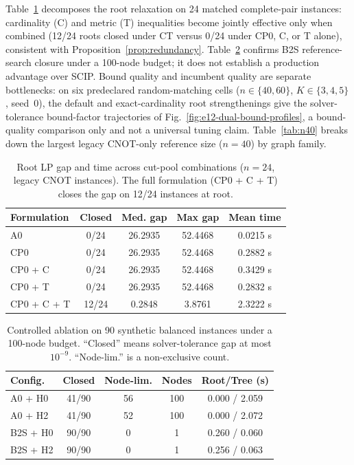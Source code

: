 \documentclass[
  aps,
  pra,
  reprint,
  amsmath,
  amssymb,
  longbibliography,
  nofootinbib,
  floatfix
]{revtex4-2}
\theoremstyle{plain}
\newcommand{\tabfit}[1]{{\footnotesize #1}}
\begin{document}
Table~\ref{tab:synergy} decomposes the root relaxation on 24 matched complete-pair instances: cardinality (C) and metric (T) inequalities become jointly effective only when combined (12/24 roots closed under CT versus 0/24 under CP0, C, or T alone), consistent with Proposition~\ref{prop:redundancy}. Table~\ref{tab:ablation} confirms B2S reference-search closure under a 100-node budget; it does not establish a production advantage over SCIP. Bound quality and incumbent quality are separate bottlenecks: on six predeclared random-matching cells ($n\in\{40,60\}$, $K\in\{3,4,5\}$, seed~0), the default and exact-cardinality root strengthenings give the solver-tolerance bound-factor trajectories of Fig.~\ref{fig:e12-dual-bound-profiles}, a bound-quality comparison only and not a universal tuning claim. Table~\ref{tab:n40} breaks down the largest legacy CNOT-only reference size ($n=40$) by graph family.

\begin{table}[t]
\centering
\caption{Root LP gap and time across cut-pool combinations ($n=24$, legacy CNOT instances). The full formulation (CP0 + C + T) closes the gap on 12/24 instances at root.}
\label{tab:synergy}
\tabfit{%
\begin{tabular}{lcccc}
\toprule
\textbf{Formulation} & \textbf{Closed} & \textbf{Med. gap} & \textbf{Max gap} & \textbf{Mean time}\\
\midrule
A0 & 0/24 & 26.2935 & 52.4468 & 0.0215 s\\
CP0 & 0/24 & 26.2935 & 52.4468 & 0.2882 s\\
CP0 + C & 0/24 & 26.2935 & 52.4468 & 0.3429 s\\
CP0 + T & 0/24 & 26.2935 & 52.4468 & 0.2832 s\\
CP0 + C + T & 12/24 & 0.2848 & 3.8761 & 2.3222 s\\
\bottomrule
\end{tabular}
}
\end{table}

\begin{table}[t]
\centering
\caption{Controlled ablation on 90 synthetic balanced instances under a 100-node budget. ``Closed'' means solver-tolerance gap at most $10^{-9}$. ``Node-lim.'' is a non-exclusive count.}
\label{tab:ablation}
\tabfit{%
\begin{tabular}{lcccc}
\toprule
\textbf{Config.} & \textbf{Closed} & \textbf{Node-lim.} & \textbf{Nodes} & \textbf{Root/Tree (s)}\\
\midrule
A0 + H0   & 41/90 & 56 & 100 & 0.000 / 2.059\\
A0 + H2            & 41/90 & 52 & 100 & 0.000 / 2.072\\
B2S + H0       & 90/90 &  0 &   1 & 0.260 / 0.060\\
B2S + H2       & 90/90 &  0 &   1 & 0.256 / 0.063\\
\bottomrule
\end{tabular}
}
\end{table}
\end{document}
